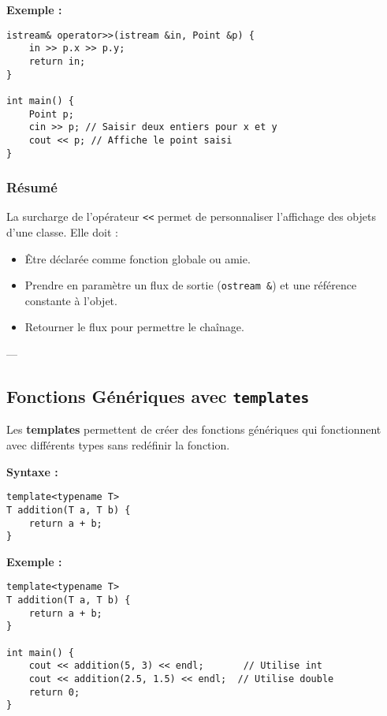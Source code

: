 \textbf{Exemple :}
\begin{tcolorbox}[colframe=blue!50!black, colback=blue!5!white, title=Exemple de Surcharge de l'Opérateur >>]
\begin{verbatim}
istream& operator>>(istream &in, Point &p) {
    in >> p.x >> p.y;
    return in;
}

int main() {
    Point p;
    cin >> p; // Saisir deux entiers pour x et y
    cout << p; // Affiche le point saisi
}
\end{verbatim}
\end{tcolorbox}

\subsubsection{ Résumé}
La surcharge de l'opérateur \texttt{<<} permet de personnaliser l'affichage des objets d'une classe. Elle doit :
\begin{itemize}
    \item Être déclarée comme fonction globale ou amie.
    \item Prendre en paramètre un flux de sortie (\texttt{ostream \&}) et une référence constante à l'objet.
    \item Retourner le flux pour permettre le chaînage.
\end{itemize}

---

\subsection{ Fonctions Génériques avec \texttt{templates}}
Les \textbf{templates} permettent de créer des fonctions génériques qui fonctionnent avec différents types sans redéfinir la fonction.

\textbf{Syntaxe :}
\begin{tcolorbox}[colframe=blue!50!black, colback=blue!5!white, title=Syntaxe des Templates]
\begin{verbatim}
template<typename T>
T addition(T a, T b) {
    return a + b;
}
\end{verbatim}
\end{tcolorbox}

\textbf{Exemple :}
\begin{tcolorbox}[colframe=blue!50!black, colback=blue!5!white, title=Exemple de Template]
\begin{verbatim}
template<typename T>
T addition(T a, T b) {
    return a + b;
}

int main() {
    cout << addition(5, 3) << endl;       // Utilise int
    cout << addition(2.5, 1.5) << endl;  // Utilise double
    return 0;
}
\end{verbatim}
\end{tcolorbox}

